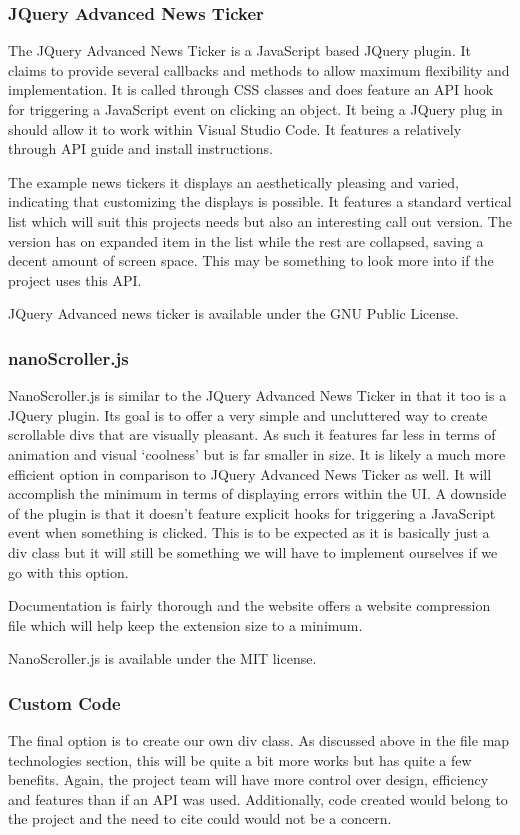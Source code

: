 \documentclass[letterpaper,10pt,titlepage,draftclsnofoot,onecolumn,onesided] {IEEEtran}
\begin{document}
\subsubsection{JQuery Advanced News Ticker}
The JQuery Advanced News Ticker is a JavaScript based JQuery plugin. 
It claims to provide several callbacks and methods to allow maximum flexibility and implementation. 
It is called through CSS classes and does feature an API hook for triggering a JavaScript event on clicking an object. 
It being a JQuery plug in should allow it to work within Visual Studio Code. 
It features a relatively through API guide and install instructions.

The example news tickers it displays an aesthetically pleasing and varied, indicating that customizing the displays is possible. 
It features a standard vertical list which will suit this projects needs but also an interesting call out version. 
The version has on expanded item in the list while the rest are collapsed, saving a decent amount of screen space. 
This may be something to look more into if the project uses this API.

JQuery Advanced news ticker is available under the GNU Public License.

\subsubsection{nanoScroller.js}
NanoScroller.js is similar to the JQuery Advanced News Ticker in that it too is a JQuery plugin. 
Its goal is to offer a very simple and uncluttered way to create scrollable divs that are visually pleasant. 
As such it features far less in terms of animation and visual `coolness' but is far smaller in size.
It is likely a much more efficient option in comparison to JQuery Advanced News Ticker as well. 
It will accomplish the minimum in terms of displaying errors within the UI. 
A downside of the plugin is that it doesn't feature explicit hooks for triggering a JavaScript event when something is clicked. 
This is to be expected as it is basically just a div class but it will still be something we will have to implement ourselves if we go with this option.

Documentation is fairly thorough and the website offers a website compression file which will help keep the extension size to a minimum. 

NanoScroller.js is available under the MIT license. 

\subsubsection{Custom Code}
The final option is to create our own div class. 
As discussed above in the file map technologies section, this will be quite a bit more works but has quite a few benefits. 
Again, the project team will have more control over design, efficiency and features than if an API was used. 
Additionally, code created would belong to the project and the need to cite could would not be a concern.
\end{document}
